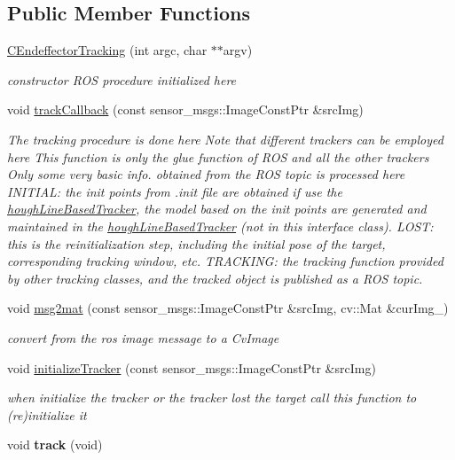 \subsection*{\-Public \-Member \-Functions}
\begin{DoxyCompactItemize}
\item 
\hyperlink{classCEndeffectorTracking_ab7bf591040f18d2579359d41b0e7b0b9}{\-C\-Endeffector\-Tracking} (int argc, char $\ast$$\ast$argv)
\begin{DoxyCompactList}\small\item\em constructor \-R\-O\-S procedure initialized here \end{DoxyCompactList}\item 
void \hyperlink{classCEndeffectorTracking_a2f767ddfe49a2759c6365c910be798cd}{track\-Callback} (const sensor\-\_\-msgs\-::\-Image\-Const\-Ptr \&src\-Img)
\begin{DoxyCompactList}\small\item\em \-The tracking procedure is done here \-Note that different trackers can be employed here \-This function is only the glue function of \-R\-O\-S and all the other trackers \-Only some very basic info. obtained from the \-R\-O\-S topic is processed here \-I\-N\-I\-T\-I\-A\-L\-: the init points from .init file are obtained if use the \hyperlink{classhoughLineBasedTracker}{hough\-Line\-Based\-Tracker}, the model based on the init points are generated and maintained in the \hyperlink{classhoughLineBasedTracker}{hough\-Line\-Based\-Tracker} (not in this interface class). \-L\-O\-S\-T\-: this is the reinitialization step, including the initial pose of the target, corresponding tracking window, etc. \-T\-R\-A\-C\-K\-I\-N\-G\-: the tracking function provided by other tracking classes, and the tracked object is published as a \-R\-O\-S topic. \end{DoxyCompactList}\item 
void \hyperlink{classCEndeffectorTracking_a271cd1f30157b1435c58e1e888400650}{msg2mat} (const sensor\-\_\-msgs\-::\-Image\-Const\-Ptr \&src\-Img, cv\-::\-Mat \&cur\-Img\-\_\-)
\begin{DoxyCompactList}\small\item\em convert from the ros image message to a \-Cv\-Image \end{DoxyCompactList}\item 
void \hyperlink{classCEndeffectorTracking_a048f6568d6cf831052d4694de357d6e6}{initialize\-Tracker} (const sensor\-\_\-msgs\-::\-Image\-Const\-Ptr \&src\-Img)
\begin{DoxyCompactList}\small\item\em when initialize the tracker or the tracker lost the target call this function to (re)initialize it \end{DoxyCompactList}\item 
\hypertarget{classCEndeffectorTracking_a19d89f27cd128c979dbbc5aabdcc12d9}{void {\bfseries track} (void)}\label{classCEndeffectorTracking_a19d89f27cd128c979dbbc5aabdcc12d9}


\end{DoxyCompactItemize}
